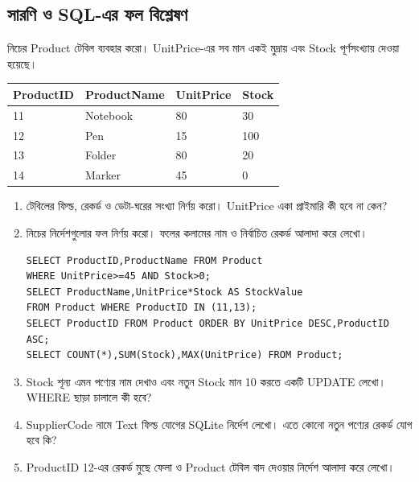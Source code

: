 \subsection{সারণি ও SQL-এর ফল বিশ্লেষণ}
নিচের Product টেবিল ব্যবহার করো। UnitPrice-এর সব মান একই মুদ্রায় এবং Stock পূর্ণসংখ্যায় দেওয়া হয়েছে।
\begin{flushleft}\small
\begin{tabular}{|l|l|l|l|}\hline
ProductID & ProductName & UnitPrice & Stock\\\hline
11 & Notebook & 80 & 30\\\hline
12 & Pen & 15 & 100\\\hline
13 & Folder & 80 & 20\\\hline
14 & Marker & 45 & 0\\\hline
\end{tabular}
\end{flushleft}
\begin{enumerate}
\item টেবিলের ফিল্ড, রেকর্ড ও ডেটা-ঘরের সংখ্যা নির্ণয় করো। UnitPrice একা প্রাইমারি কী হবে না কেন?
\item \begin{minipage}[t]{\linewidth}নিচের নির্দেশগুলোর ফল নির্ণয় করো। ফলের কলামের নাম ও নির্বাচিত রেকর্ড আলাদা করে লেখো।
\begin{verbatim}
SELECT ProductID,ProductName FROM Product
WHERE UnitPrice>=45 AND Stock>0;
SELECT ProductName,UnitPrice*Stock AS StockValue
FROM Product WHERE ProductID IN (11,13);
SELECT ProductID FROM Product ORDER BY UnitPrice DESC,ProductID ASC;
SELECT COUNT(*),SUM(Stock),MAX(UnitPrice) FROM Product;
\end{verbatim}
\end{minipage}
\item Stock শূন্য এমন পণ্যের নাম দেখাও এবং নতুন Stock মান 10 করতে একটি UPDATE লেখো। WHERE ছাড়া চালালে কী হবে?
\item SupplierCode নামে Text ফিল্ড যোগের SQLite নির্দেশ লেখো। এতে কোনো নতুন পণ্যের রেকর্ড যোগ হবে কি?
\item ProductID 12-এর রেকর্ড মুছে ফেলা ও Product টেবিল বাদ দেওয়ার নির্দেশ আলাদা করে লেখো।
\end{enumerate}


